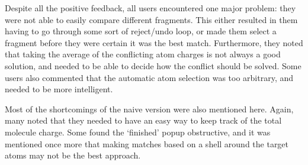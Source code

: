 Despite all the positive feedback, all users encountered one major problem: they were not able to easily compare different fragments. This either resulted in them having to go through some sort of reject/undo loop, or made them select a fragment before they were certain it was the best match. Furthermore, they noted that taking the average of the conflicting atom charges is not always a good solution, and needed to be able to decide how the conflict should be solved. Some users also commented that the automatic atom selection was too arbitrary, and needed to be more intelligent.

Most of the shortcomings of the naive version were also mentioned here. Again, many noted that they needed to have an easy way to keep track of the total molecule charge. Some found the `finished' popup obstructive, and it was mentioned once more that making matches based on a shell around the target atoms may not be the best approach.

